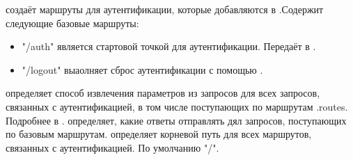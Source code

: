 \label{page-FPauth-module-FPauth-module-Make+u+Auth-module-Router-val-call}\begin{ocamlindent} создаёт маршруты для аутентификации, которые добавляются в .Содержит следующие базовые маршруты:\begin{itemize}\item{"/auth" является стартовой точкой для аутентификации. Передаёт  в \hyperref[page-FPauth-core-module-FPauth+u+core-module-Auth+u+sign-module-type-AUTHENTICATOR-val-authenticate]{}.}%
\item{"/logout" выаолняет сброс аутентификации с помощью \hyperref[page-FPauth-module-FPauth-module-Make+u+Auth-module-Authenticator-val-logout]{}.}\end{itemize}%
 определяет способ извлечения параметров из запросов для всех запросов, связанных с аутентификацией, в том числе поступающих по маршрутам .routes. Подробнее в \hyperref[page-FPauth-core-module-FPauth+u+core-module-Static-module-Params-type-extractor]{}. определяет, какие ответы отправлять дял запросов, поступающих по базовым маршрутам. определяет корневой путь для всех маршрутов, связанных с аутентификацией. По умолчанию "/".\end{ocamlindent}%
\medbreak


